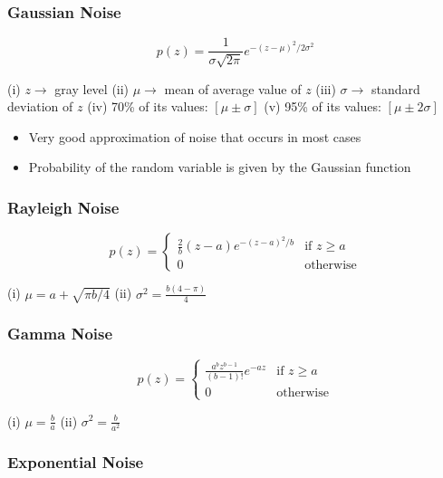 \subsubsection*{Gaussian Noise}

\begin{equation*}
  p(z) =\frac{1}{\sigma\sqrt{2 \pi}} e^{-(z - \mu)^2/2 \sigma^2}
\end{equation*}

(i) $z \rightarrow$ gray level (ii) $\mu \rightarrow$ mean of average
value of $z$ (iii) $\sigma \rightarrow$ standard deviation of $z$
(iv) 70\% of its values: $[ \mu \pm \sigma ]$ (v) 95\% of its values:
$[ \mu \pm 2\sigma ]$

\begin{itemize}
  \item Very good approximation of noise that occurs in most cases
  \item Probability of the random variable is given by the Gaussian function
\end{itemize}

\subsubsection*{Rayleigh Noise}

\begin{equation*}
  p(z) =
  \begin{cases}
    \frac{2}{b} (z-a) e^{-(z-a)^2/b} & \text{if } z \geq a \\
    0 & \text{otherwise}
  \end{cases}
\end{equation*}

(i) $\mu = a + \sqrt{\pi b / 4}$ (ii) $\sigma^2 = \frac{b(4 - \pi)}{4}$

\subsubsection*{Gamma Noise}

\begin{equation*}
  p(z) =
  \begin{cases}
    \frac{a^b z^{b-1}}{(b-1)!} e^{-az} & \text{if } z \geq a \\
    0 & \text{otherwise}
  \end{cases}
\end{equation*}

(i) $\mu = \frac{b}{a}$ (ii) $\sigma^2 = \frac{b}{a^2}$

\subsubsection*{Exponential Noise}

